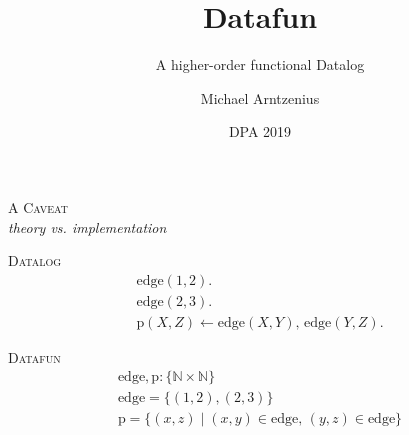 \documentclass[dvipsnames,fleqn]{beamer}
\title{Datafun}
\subtitle{A higher-order functional Datalog}
\author{Michael Arntzenius}
\institute{University of Birmingham}
\date{DPA 2019}
\providecommand\EMPH\textsc
\newcommand\kw\textbf
\newcommand\name\text
\newcommand\tset[1]{\{{#1}\}}
\newcommand\x\times
\newcommand\N{\mathbb{N}}
\newcommand\eset[1]{\{{#1}\}}
\newcommand\esetfor[2]{\eset{{#1} \mathrel{|} {#2}}}
\newcommand\efor[1]{\kw{for}\;{#1}\;\kw{do}\;}
\newcommand\ewhen[1]{\kw{when}\;{#1}\;\kw{do}\;}
\newcommand\shaded{\color{gray}}
\begin{document}
\maketitle

\Large

\begin{frame}{}
  \centering \huge
  \EMPH{A Caveat}
  \\[1ex]
  \emph{{\color{ForestGreen}theory} vs. {\color{DarkOrchid}implementation}}
\end{frame}

\newcommand\whereami[1]{
\begin{frame}
  \centering
\end{frame}
}


\whereami{0}

\begin{frame}
  \EMPH{Datalog}
  \[
  \begin{array}{l}
    \name{edge}(1,2).\\\name{edge}(2,3).\\
    \name{p}(X,Z) \gets \name{edge}(X,Y),\, \name{edge}(Y,Z).
  \end{array}
  \]
  \vspace{0pt} %

  \EMPH{Datafun}
  \[
  \begin{array}{l}
    \name{edge}, \name{p} : \tset{\N \x \N}\\
    \name{edge} = \eset{(1,2), (2,3)}\\
    \name{p} =
    \esetfor{(x,z)}{(x,y) \in \name{edge},\, (y,z) \in \name{edge}}
  \end{array}
  \]
  \vspace{1em}
\end{frame}
\end{document}

